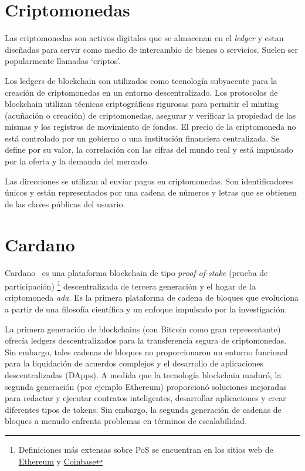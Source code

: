 \documentclass[12pt]{book}
\begin{document}
\section{Criptomonedas}

Las criptomonedas son activos digitales que se almacenan en el \textit{ledger} y estan diseñadas para servir como medio de intercambio de bienes o servicios. Suelen ser popularmente llamadas `criptos'.

Los ledgers de blockchain son utilizados como tecnología subyacente para la creación de criptomonedas en un entorno descentralizado. Los protocolos de blockchain utilizan técnicas criptográficas rigurosas para permitir el minting (acuñación o creación) de criptomonedas, asegurar y verificar la propiedad de las mismas y los registros de movimiento de fondos. El precio de la criptomoneda no está controlado por un gobierno o una institución financiera centralizada. Se define por su valor, la correlación con las cifras del mundo real y está impulsado por la oferta y la demanda del mercado.

Las direcciones se utilizan al enviar pagos en criptomonedas. Son identificadores únicos y están representados por una cadena de números y letras que se obtienen de las claves públicas del usuario.

\section{Cardano}

Cardano~\cite{cardano_docs} es una plataforma blockchain de tipo \textit{proof-of-stake} (prueba de participación)
\footnote{Definiciones más extensas sobre PoS se encuentran en los sitios web de \href{https://ethereum.org/en/developers/docs/consensus-mechanisms/pos/}{Ethereum} y \href{https://www.coinbase.com/es/learn/crypto-basics/what-is-proof-of-work-or-proof-of-stake}{Coinbase}}
descentralizada de tercera generación y el hogar de la criptomoneda \textit{ada}. Es la primera plataforma de cadena de bloques que evoluciona a partir de una filosofía científica y un enfoque impulsado por la investigación.

La primera generación de blockchains (con Bitcoin como gran representante) ofrecía ledgers descentralizados para la transferencia segura de criptomonedas. Sin embargo, tales cadenas de bloques no proporcionaron un entorno funcional para la liquidación de acuerdos complejos y el desarrollo de aplicaciones descentralizadas (DApps). A medida que la tecnología blockchain maduró, la segunda generación (por ejemplo Ethereum) proporcionó soluciones mejoradas para redactar y ejecutar contratos inteligentes, desarrollar aplicaciones y crear diferentes tipos de tokens. Sin embargo, la segunda generación de cadenas de bloques a menudo enfrenta problemas en términos de escalabilidad.
\end{document}
